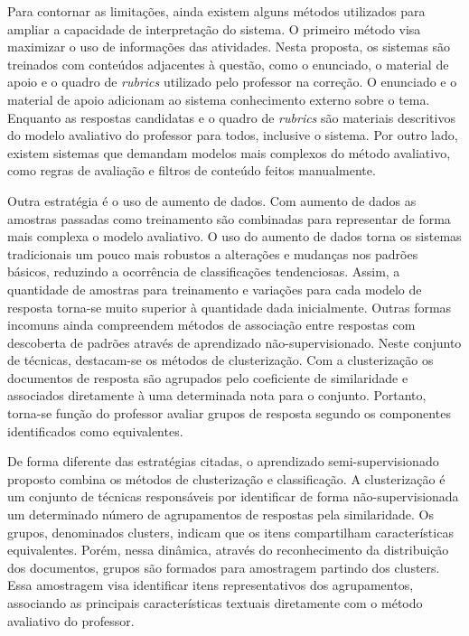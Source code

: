 Para contornar as limitações, ainda existem alguns métodos utilizados para ampliar a capacidade de interpretação do sistema. O primeiro método visa maximizar o uso de informações das atividades. Nesta proposta, os sistemas são treinados com conteúdos adjacentes à questão, como o enunciado, o material de apoio e o quadro de \textit{rubrics} utilizado pelo professor na correção. O enunciado e o material de apoio adicionam ao sistema conhecimento externo sobre o tema. Enquanto as respostas candidatas e o quadro de \textit{rubrics} são materiais descritivos do modelo avaliativo do professor para todos, inclusive o sistema. Por outro lado, existem sistemas que demandam modelos mais complexos do método avaliativo, como regras de avaliação e filtros de conteúdo feitos manualmente.

Outra estratégia é o uso de aumento de dados. Com aumento de dados as amostras passadas como treinamento são combinadas para representar de forma mais complexa o modelo avaliativo. O uso do aumento de dados torna os sistemas tradicionais um pouco mais robustos a alterações e mudanças nos padrões básicos, reduzindo a ocorrência de classificações tendenciosas. Assim, a quantidade de amostras para treinamento e variações para cada modelo de resposta torna-se muito superior à quantidade dada inicialmente. Outras formas incomuns ainda compreendem métodos de associação entre respostas com descoberta de padrões através de aprendizado não-supervisionado. Neste conjunto de técnicas, destacam-se os métodos de clusterização. Com a clusterização os documentos de resposta são agrupados pelo coeficiente de similaridade e associados diretamente à uma determinada nota para o conjunto. Portanto, torna-se função do professor avaliar grupos de resposta segundo os componentes identificados como equivalentes.

De forma diferente das estratégias citadas, o aprendizado semi-supervisionado proposto combina os métodos de clusterização e classificação. A clusterização é um conjunto de técnicas responsáveis por identificar de forma não-supervisionada um  determinado número de agrupamentos de respostas pela similaridade. Os grupos, denominados clusters, indicam que os itens compartilham características equivalentes. Porém, nessa dinâmica, através do reconhecimento da distribuição dos documentos, grupos são formados para amostragem partindo dos clusters. Essa amostragem visa identificar itens representativos dos agrupamentos, associando as principais características textuais diretamente com o método avaliativo do professor.

